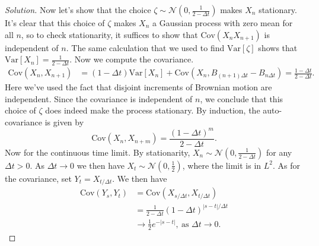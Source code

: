 \documentclass[11pt,letterpaper]{report}
\newcommand{\mcal}[1]{\mathcal{#1}}
\newcommand{\Var}{\text{Var}}
\newcommand{\Cov}{\text{Cov}}
\newenvironment{solution}
{\begin{proof}[Solution]}
{\end{proof}}
\begin{document}
\begin{solution}
	\noindent Now let's show that the choice $\zeta \sim \mcal{N}(0, \frac{1}{2-\Delta t})$ makes $X_n$ stationary. It's clear that this choice of $\zeta$ makes $X_n$ a Gaussian process with zero mean for all $n$, so to check stationarity, it suffices to show that $\Cov(X_nX_{n+1})$ is independent of $n$. The same calculation that we used to find $\Var[\zeta]$ shows that $\Var[X_n] = \frac{1}{2-\Delta t}$. Now we compute the covariance.
	\begin{align*}
	\Cov(X_n, X_{n+1}) &= (1-\Delta t)\Var[X_n] + \Cov(X_n, B_{(n+1)\Delta t} - B_{n\Delta t}) = \frac{1-\Delta t}{2-\Delta t}.
	\end{align*}
	Here we've used the fact that disjoint increments of Brownian motion are independent. Since the covariance is independent of $n$, we conclude that this choice of $\zeta$ does indeed make the process stationary. By induction, the auto-covariance is given by
	\[
	\Cov(X_n, X_{n+m}) = \frac{(1-\Delta t)^m}{2-\Delta t}.
	\]
	Now for the continuous time limit. By stationarity, $X_n \sim \mcal{N}(0, \frac{1}{2-\Delta t})$ for any $\Delta t>0$. As $\Delta t\to 0$ we then have $X_t \sim \mcal{N}(0, \frac{1}{2})$, where the limit is in $L^2$. As for the covariance, set $Y_t = X_{t/\Delta t}$. We then have
	\begin{align*}
		\Cov(Y_s, Y_t) &= \Cov(X_{s/\Delta t}, X_{t/\Delta t})\\
		&= \frac{1}{2-\Delta t}(1-\Delta t)^{|s-t|/\Delta t}\\
		&\to \frac{1}{2}e^{-|s-t|},\ \text{as }\Delta t\to 0.
	\end{align*}
\end{solution}
\end{document}
